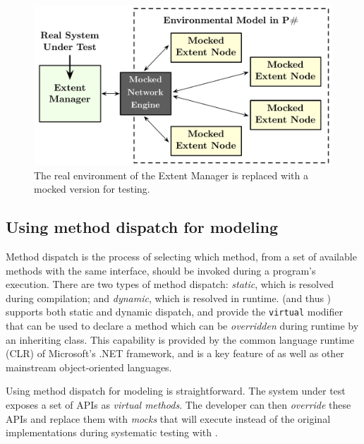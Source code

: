 \begin{figure}[t]
\centering
\includegraphics[width=\linewidth]{img/mocked_engine}
\caption{The real environment of the Extent Manager is replaced with a mocked version for testing.}
\label{fig:azurestoremodel}
\end{figure}

\subsection{Using method dispatch for modeling}
\label{sec:method:dd}

Method dispatch is the process of selecting which method, from a set of available methods with the same interface, should be invoked during a program's execution. There are two types of method dispatch: \emph{static}, which is resolved during compilation; and \emph{dynamic}, which is resolved in runtime.  \csharp (and thus \psharp) supports both static and dynamic dispatch, and provide the \texttt{virtual} modifier that can be used to declare a method which can be \emph{overridden} during runtime by an inheriting class. This capability is provided by the common language runtime (CLR) of Microsoft's .NET framework, and is a key feature of \csharp as well as other mainstream object-oriented languages.

Using method dispatch for modeling is straightforward. The system under test exposes a set of APIs as \emph{virtual methods}. The developer can then \emph{override} these APIs and replace them with \emph{mocks} that will execute instead of the original implementations during systematic testing with \psharp.

